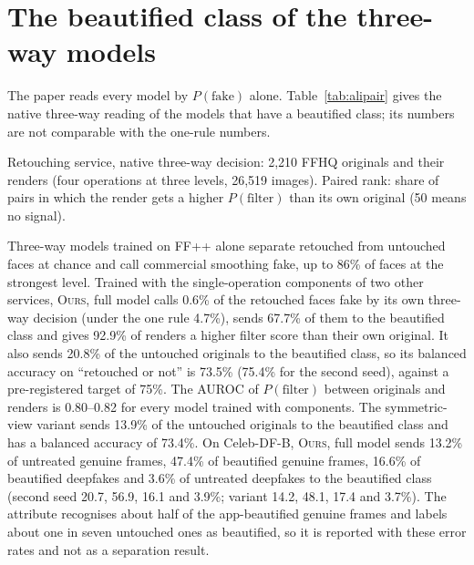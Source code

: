 \documentclass[10pt]{article}
\newcommand{\oursF}{\textsc{Ours}, full model}
\begin{document}
\section{The beautified class of the three-way models}
\label{sec:native}
The paper reads every model by $P(\text{fake})$ alone. Table~\ref{tab:alipair} gives the native three-way reading of the models that
have a beautified class; its numbers are not comparable with the one-rule numbers.
\begin{table}[H]
\centering
\caption{Retouching service, native three-way decision: 2,210 FFHQ originals and their renders (four operations at three levels,
26,519 images). Paired rank: share of pairs in which the render gets a higher $P(\text{filter})$ than its own original (50 means no
signal).}
\label{tab:alipair}
\footnotesize
\begin{adjustbox}{max width=\linewidth}\end{adjustbox}
\end{table}
Three-way models trained on FF++ alone separate retouched from untouched faces at chance and call commercial smoothing fake, up to 86\%
of faces at the strongest level. Trained with the single-operation components of two other services, \oursF{} calls 0.6\% of the
retouched faces fake by its own three-way decision (under the one rule 4.7\%), sends 67.7\% of them to the beautified class and gives 92.9\%
of renders a higher filter score than their own original. It also sends 20.8\% of the untouched originals to the beautified class, so its
balanced accuracy on ``retouched or not'' is 73.5\% (75.4\% for the second seed), against a pre-registered target of 75\%. The AUROC
of $P(\text{filter})$ between originals and renders is 0.80--0.82 for every model trained with components. The symmetric-view variant
sends 13.9\% of the untouched originals to the beautified class and has a balanced accuracy of 73.4\%. On Celeb-DF-B, \oursF{} sends 13.2\%
of untreated genuine frames, 47.4\% of beautified genuine frames, 16.6\% of beautified deepfakes and 3.6\% of untreated deepfakes to
the beautified class (second seed 20.7, 56.9, 16.1 and 3.9\%; variant 14.2, 48.1, 17.4 and 3.7\%). The attribute recognises about half of
the app-beautified genuine frames and labels about one in seven untouched ones as beautified, so it is reported with these error
rates and not as a separation result.
\end{document}
